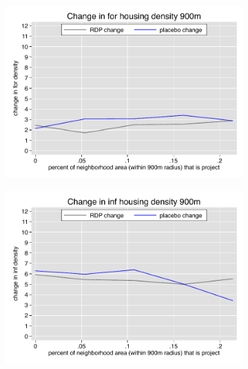 \documentclass[12pt]{article}
\begin{document}
\begin{figure}
        \begin{subfigure}[b]{0.495\textwidth}
            \centering
            \includegraphics[width=\textwidth,trim={0.3cm .3cm 0.1cm 0cm}, clip=true]{figures/change_for_900_total.pdf}
        \end{subfigure}
        \hfill
        \begin{subfigure}[b]{0.495\textwidth}  
            \centering 
            \includegraphics[width=\textwidth,trim={0.3cm .3cm 0.1cm 0cm}, clip=true]{figures/change_inf_900_total.pdf}
        \end{subfigure}
        \vspace{-6mm}
  \end{figure} 
\end{document}
